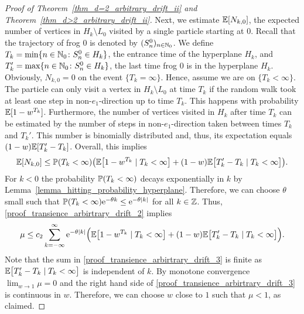 \begin{proof}[Proof of Theorem~\ref{thm_d=2_arbitrary_drift_ii} and Theorem~\ref{thm_d>2_arbitrary_drift_ii}]
Next, we estimate $\E[N_{k,0}]$, the expected number of vertices in $H_k \setminus L_0$ visited by a single particle starting at $0$. Recall that the trajectory of frog $0$ is denoted by $(S_n^0)_{n\in \N_0}$. We define $T_k = \min\{n \in \N_0 \colon S_n^0 \in H_k\}$, the entrance time of the hyperplane $H_k$, and $T_k' = \max\{n \in \N_0 \colon S_n^0 \in H_k\}$, the last time frog $0$ is in the hyperplane $H_k$. Obviously, $N_{k,0}=0$ on the event $\{T_k = \infty\}$. Hence, assume we are on $\{T_k < \infty\}$. The particle can only visit a vertex in $H_k \setminus L_0$ at time $T_k$ if the random walk took at least one step in non-$e_1$-direction up to time $T_k$. This happens with probability $\E[1-w^{T_k}]$. Furthermore, the number of vertices visited in $H_k$ after time $T_k$ can be estimated by the number of steps in non-$e_1$-direction taken between times $T_k$ and $T_k'$. This number is binomially distributed and, thus, its expectation equals $(1-w)\E[T_k'-T_k]$. Overall, this implies
\begin{align*}
 \E[N_{k,0}] \leq  \P(T_k < \infty) \bigr(\E\bigl[1- w^{T_k} \mid T_k < \infty \bigr] + (1-w) \E\bigl[T_k' - T_k \mid T_k <\infty\bigr] \bigl).
\end{align*}
For $k < 0$ the probability $\P(T_k < \infty)$ decays exponentially in $k$ by Lemma~\ref{lemma_hitting_probability_hyperplane}. Therefore, we can choose $\theta$ small such that $\P(T_k < \infty) \e^{-\theta k} \leq  \e^{-\theta \lvert k \rvert}$ for all $k \in \Z$. Thus, \eqref{proof_transience_arbirtrary_drift_2} implies
\begin{equation}\label{proof_transience_arbirtrary_drift_3}
 \mu \leq  c_2 \sum_{k=-\infty}^{\infty}  \e^{-\theta \lvert k \rvert}\Bigr( \E\bigl[1- w^{T_k} \mid T_k < \infty \bigr] + (1-w) \E\bigl[T_k' - T_k \mid T_k <\infty\bigr] \Bigl).
\end{equation}
Note that the sum in \eqref{proof_transience_arbirtrary_drift_3} is finite as $\E\bigl[T_k' - T_k \mid T_k <\infty\bigr]$ is independent of $k$.
By monotone convergence $\lim_{w \to 1} \mu =0$ and the right hand side of \eqref{proof_transience_arbirtrary_drift_3} is continuous in $w$. Therefore, we can choose $w$ close to $1$ such that $\mu < 1$, as claimed.
\end{proof}

